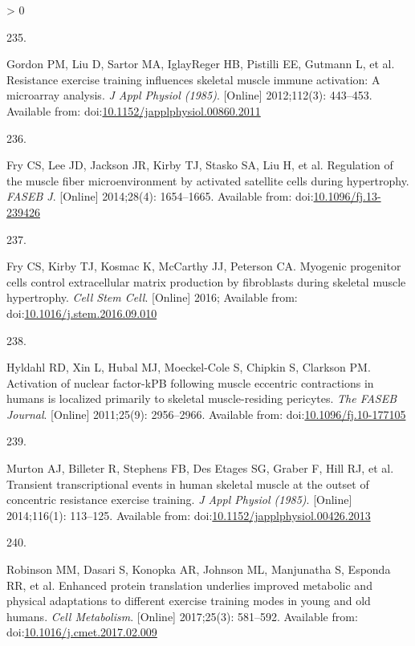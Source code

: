 \documentclass[twoside,10pt]{gihclass} %
\newlength{\cslhangindent}
\newlength{\csllabelwidth}
\newenvironment{CSLReferences}[3] %
 {%
  \setlength{\parindent}{0pt}
  \ifodd #1 \everypar{\setlength{\hangindent}{\cslhangindent}}\ignorespaces\fi
  \ifnum #2 > 0
  \setlength{\parskip}{#2\baselineskip}
  \fi
 }%
 {}
\newcommand{\CSLLeftMargin}[1]{\parbox[t]{\maxof{\widthof{#1}}{\csllabelwidth}}{#1}}
\newcommand{\CSLRightInline}[1]{\parbox[t]{\linewidth}{#1}}
\begin{document}
\begin{CSLReferences}{0}{0}
\leavevmode\hypertarget{ref-RN1825}{}%
\CSLLeftMargin{235. }
\CSLRightInline{Gordon PM, Liu D, Sartor MA, IglayReger HB, Pistilli EE, Gutmann L, et al. Resistance exercise training influences skeletal muscle immune activation: A microarray analysis. \emph{J Appl Physiol (1985)}. {[}Online{]} 2012;112(3): 443--453. Available from: doi:\href{https://doi.org/10.1152/japplphysiol.00860.2011}{10.1152/japplphysiol.00860.2011}}

\leavevmode\hypertarget{ref-RN1354}{}%
\CSLLeftMargin{236. }
\CSLRightInline{Fry CS, Lee JD, Jackson JR, Kirby TJ, Stasko SA, Liu H, et al. Regulation of the muscle fiber microenvironment by activated satellite cells during hypertrophy. \emph{FASEB J}. {[}Online{]} 2014;28(4): 1654--1665. Available from: doi:\href{https://doi.org/10.1096/fj.13-239426}{10.1096/fj.13-239426}}

\leavevmode\hypertarget{ref-RN1888}{}%
\CSLLeftMargin{237. }
\CSLRightInline{Fry CS, Kirby TJ, Kosmac K, McCarthy JJ, Peterson CA. Myogenic progenitor cells control extracellular matrix production by fibroblasts during skeletal muscle hypertrophy. \emph{Cell Stem Cell}. {[}Online{]} 2016; Available from: doi:\href{https://doi.org/10.1016/j.stem.2016.09.010}{10.1016/j.stem.2016.09.010}}

\leavevmode\hypertarget{ref-RN2408}{}%
\CSLLeftMargin{238. }
\CSLRightInline{Hyldahl RD, Xin L, Hubal MJ, Moeckel-Cole S, Chipkin S, Clarkson PM. Activation of nuclear factor-kPB following muscle eccentric contractions in humans is localized primarily to skeletal muscle-residing pericytes. \emph{The FASEB Journal}. {[}Online{]} 2011;25(9): 2956--2966. Available from: doi:\href{https://doi.org/10.1096/fj.10-177105}{10.1096/fj.10-177105}}

\leavevmode\hypertarget{ref-RN2299}{}%
\CSLLeftMargin{239. }
\CSLRightInline{Murton AJ, Billeter R, Stephens FB, Des Etages SG, Graber F, Hill RJ, et al. Transient transcriptional events in human skeletal muscle at the outset of concentric resistance exercise training. \emph{J Appl Physiol (1985)}. {[}Online{]} 2014;116(1): 113--125. Available from: doi:\href{https://doi.org/10.1152/japplphysiol.00426.2013}{10.1152/japplphysiol.00426.2013}}

\leavevmode\hypertarget{ref-RN2400}{}%
\CSLLeftMargin{240. }
\CSLRightInline{Robinson MM, Dasari S, Konopka AR, Johnson ML, Manjunatha S, Esponda RR, et al. Enhanced protein translation underlies improved metabolic and physical adaptations to different exercise training modes in young and old humans. \emph{Cell Metabolism}. {[}Online{]} 2017;25(3): 581--592. Available from: doi:\href{https://doi.org/10.1016/j.cmet.2017.02.009}{10.1016/j.cmet.2017.02.009}}


\end{CSLReferences}
\end{document}
